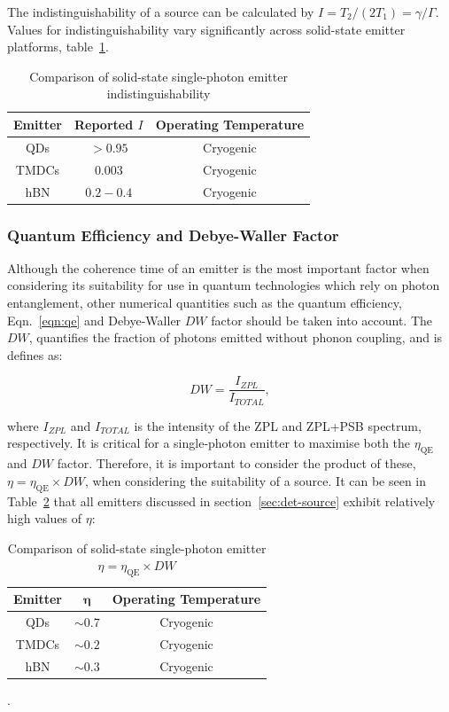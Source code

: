 The indistinguishability of a source can be calculated by $I= T_2/(2T_1)=\gamma/\Gamma$. Values for indistinguishability vary significantly across solid-state emitter platforms, table~\ref{tab:t2-compare}.

\begin{table}[h]
\centering
\begin{tabular}{|c|c|c|}
\hline
\textbf{Emitter} & \textbf{Reported $I$} & \textbf{Operating Temperature} \\
\hline
QDs & $>0.95$ \cite{Ulhaq2010, Somaschi2016} & Cryogenic  \\
\hline
TMDCs & $0.003$ \cite{vonHelversen2023} & Cryogenic  \\
\hline
hBN & $0.2-0.4$ \cite{Fournier2023, Horder2022}  & Cryogenic \\
\hline
\end{tabular}
\caption{Comparison of solid-state single-photon emitter indistinguishability}
\label{tab:t2-compare}
\end{table}


\subsubsection{Quantum Efficiency and Debye-Waller Factor}

Although the coherence time of an emitter is the most important factor when considering its suitability for use in quantum technologies which rely on photon entanglement, other numerical quantities such as the quantum efficiency, Eqn.~\ref{eqn:qe} and Debye-Waller $DW$ factor should be taken into account. The $DW$, quantifies the fraction of photons emitted without phonon coupling, and is defines as:

\begin{equation}
    DW=\frac{I_{ZPL}}{I_{TOTAL}},
\end{equation}

where $I_{ZPL}$ and $I_{TOTAL}$ is the intensity of the ZPL and ZPL+PSB spectrum, respectively. It is critical for a single-photon emitter to maximise both the $\eta_{\text{QE}}$ and $DW$ factor. Therefore, it is important to consider the product of these, $\eta = \eta_{\text{QE}}\times DW$, when considering the suitability of a source. It can be seen in Table~\ref{tab:eta-compare} that all emitters discussed in section~\ref{sec:det-source} exhibit relatively high values of $\eta$:

\begin{table}[h]
\centering
\begin{tabular}{|c|c|c|}
\hline
\textbf{Emitter} & $\mathbf{\eta}$ & \textbf{Operating Temperature} \\
\hline
QDs & $\sim0.7$ \cite{Somaschi2016} & Cryogenic  \\
\hline
TMDCs & $\sim0.2$ \cite{Micevic2022,Cai2024} & Cryogenic  \\
\hline
hBN & $\sim0.3$ \cite{Tran2016, Yamamura2024} & Cryogenic \\
\hline
\end{tabular}
\caption{Comparison of solid-state single-photon emitter $\eta = \eta_{\text{QE}} \times DW$}.
\label{tab:eta-compare}
\end{table}
